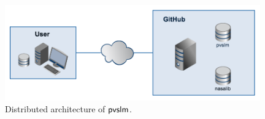 \begin{figure}
  \centering \includegraphics[width=11cm]{images/arch.png}
  \caption{Distributed architecture of $\textsf{pvslm}$.}
  \label{fig.arch}
\end{figure}
